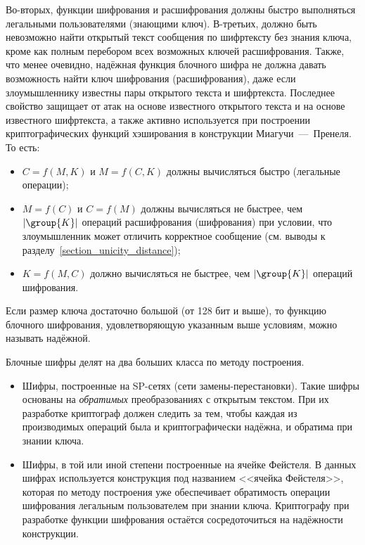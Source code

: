 Во-вторых, функции шифрования и расшифрования должны быстро выполняться легальными пользователями (знающими ключ). В-третьих, должно быть невозможно найти открытый текст сообщения по шифртексту без знания ключа, кроме как полным перебором всех возможных ключей расшифрования. Также, что менее очевидно, надёжная функция блочного шифра не должна давать возможность найти ключ шифрования (расшифрования), даже если злоумышленнику известны пары открытого текста и шифртекста. Последнее свойство защищает от атак на основе известного открытого текста и на основе известного шифртекста, а также активно используется при построении криптографических функций хэширования в конструкции Миагучи~---~Пренеля. То есть:
\begin{itemize}
	\item $C = f \left( M, K \right)$ и $M = f \left( C, K \right)$ должны вычисляться быстро (легальные операции);
	\item $M = f \left( C \right)$ и $C = f \left( M \right)$ должны вычисляться не быстрее, чем $\left| \group{K} \right|$ операций расшифрования (шифрования) при условии, что злоумышленник может отличить корректное сообщение (см. выводы к разделу~\ref{section_unicity_distance});
	\item $K = f \left( M, C \right)$ должно вычисляться не быстрее, чем $\left| \group{K} \right|$ операций шифрования.
\end{itemize}

Если размер ключа достаточно большой (от 128 бит и выше), то функцию блочного шифрования, удовлетворяющую указанным выше условиям, можно называть надёжной.

Блочные шифры делят на два больших класса по методу построения.
\begin{itemize}
	\item Шифры, построенные на SP-сетях (сети замены-пере\-становки). Такие шифры основаны на \emph{обратимых} преобразованиях с открытым текстом. При их разработке криптограф должен следить за тем, чтобы каждая из производимых операций была и криптографически надёжна, и обратима при знании ключа.
	\item Шифры, в той или иной степени построенные на ячейке Фейстеля. В данных шифрах используется конструкция под названием <<ячейка Фейстеля>>, которая по методу построения уже обеспечивает обратимость операции шифрования легальным пользователем при знании ключа. Криптографу при разработке функции шифрования остаётся сосредоточиться на надёжности конструкции.
\end{itemize}

